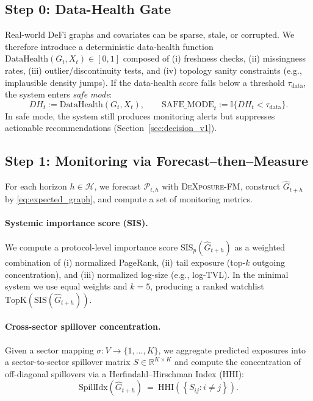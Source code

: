 \subsection{Step 0: Data-Health Gate}
Real-world DeFi graphs and covariates can be sparse, stale, or corrupted. We therefore introduce a deterministic data-health function $\mathrm{DataHealth}(G_t,X_t)\in[0,1]$ composed of (i) freshness checks, (ii) missingness rates, (iii) outlier/discontinuity tests, and (iv) topology sanity constraints (e.g., implausible density jumps). If the data-health score falls below a threshold $\tau_{\mathrm{data}}$, the system enters \emph{safe mode}:
\begin{equation}
\label{eq:safe_mode}
DH_t := \mathrm{DataHealth}(G_t,X_t), \qquad
\mathrm{SAFE\_MODE}_t := \mathbb{I}\{DH_t < \tau_{\mathrm{data}}\}.
\end{equation}
In safe mode, the system still produces monitoring alerts but suppresses actionable recommendations (Section~\ref{sec:decision_v1}).

\subsection{Step 1: Monitoring via Forecast--then--Measure}
\label{sec:monitoring}
For each horizon $h\in\mathcal{H}$, we forecast $\mathcal{P}_{t,h}$ with \textsc{DeXposure-FM}, construct $\widehat{G}_{t+h}$ by \eqref{eq:expected_graph}, and compute a set of monitoring metrics.

\paragraph{Systemic importance score (SIS).}
We compute a protocol-level importance score $\mathrm{SIS}_p(\widehat{G}_{t+h})$ as a weighted combination of (i) normalized PageRank, (ii) tail exposure (top-$k$ outgoing concentration), and (iii) normalized log-size (e.g., log-TVL). In the minimal system we use equal weights and $k=5$, producing a ranked watchlist $\mathrm{TopK}(\mathrm{SIS}(\widehat{G}_{t+h}))$.

\paragraph{Cross-sector spillover concentration.}
Given a sector mapping $\sigma:V\to\{1,\dots,K\}$, we aggregate predicted exposures into a sector-to-sector spillover matrix $S\in\mathbb{R}^{K\times K}$ and compute the concentration of off-diagonal spillovers via a Herfindahl--Hirschman Index (HHI):
\begin{equation}
\label{eq:spillover_hhi}
\mathrm{SpillIdx}(\widehat{G}_{t+h})
~=~
\mathrm{HHI}\!\left(\left\{S_{ij}: i\neq j\right\}\right).
\end{equation}

